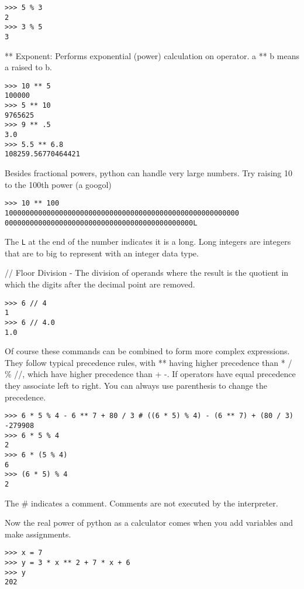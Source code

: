 \documentclass[12pt]{article}
\begin{document}
\begin{lstlisting}[style=bash]
>>> 5 % 3
2
>>> 3 % 5
3
\end{lstlisting}

** Exponent: Performs exponential (power) calculation on operator. a ** b means a raised to b.

\begin{lstlisting}[style=bash]
>>> 10 ** 5
100000
>>> 5 ** 10 
9765625
>>> 9 ** .5
3.0
>>> 5.5 ** 6.8
108259.56770464421
\end{lstlisting}

Besides fractional powers, python can handle very large numbers. Try raising 10 to the 100th power (a googol)

\begin{lstlisting}[style=bash]
>>> 10 ** 100
10000000000000000000000000000000000000000000000000000000
000000000000000000000000000000000000000000000L
\end{lstlisting}

The \texttt{L} at the end of the number indicates it is a long. Long integers are integers that are to big to represent with an integer data type.  


// Floor Division - The division of operands where the result is the quotient in which the digits after the decimal point are removed.	

\begin{lstlisting}[style=bash]
>>> 6 // 4
1
>>> 6 // 4.0
1.0
\end{lstlisting}

Of course these commands can be combined to form more complex expressions. They follow typical precedence rules, with ** having higher precedence than * / \% //, which have higher precedence than + -. If operators have equal precedence they associate left to right. You can always use parenthesis to change the precedence.

\begin{lstlisting}[style=bash]
>>> 6 * 5 % 4 - 6 ** 7 + 80 / 3 # ((6 * 5) % 4) - (6 ** 7) + (80 / 3)
-279908
>>> 6 * 5 % 4
2
>>> 6 * (5 % 4)
6
>>> (6 * 5) % 4
2
\end{lstlisting}

The \# indicates a comment. Comments are not executed by the interpreter.

Now the real power of python as a calculator comes when you add variables and make assignments.

\begin{lstlisting}[style=bash]
>>> x = 7
>>> y = 3 * x ** 2 + 7 * x + 6
>>> y
202
\end{lstlisting}
\end{document}
